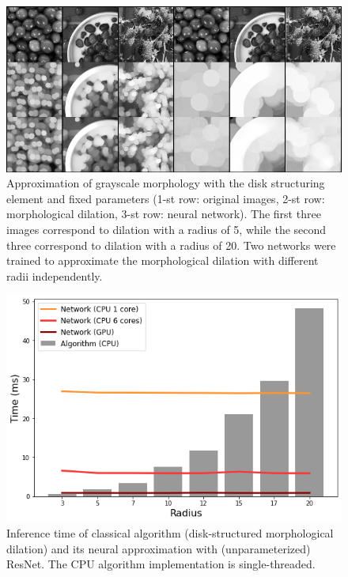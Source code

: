 \begin{figure}[h]
\centering
\includegraphics[width=0.85\linewidth]{fig/disk fixed.png}
\caption{Approximation of grayscale morphology with the disk structuring element and fixed parameters (1-st row: original images, 2-st row: morphological dilation, 3-st row: neural network). The first three images correspond to dilation with a radius of 5, while the second three correspond to dilation with a radius of 20. Two networks were trained to approximate the morphological dilation with different radii independently.}
\label{figure:Morphology}
\end{figure}


\begin{figure}[h!]
\centering
\includegraphics[width=1\linewidth]{fig/time.png}
\caption{Inference time of classical algorithm (disk-structured morphological dilation) and its neural approximation with (unparameterized) ResNet. The CPU algorithm implementation is single-threaded.}
\label{figure:InferenceTime}
\end{figure}




